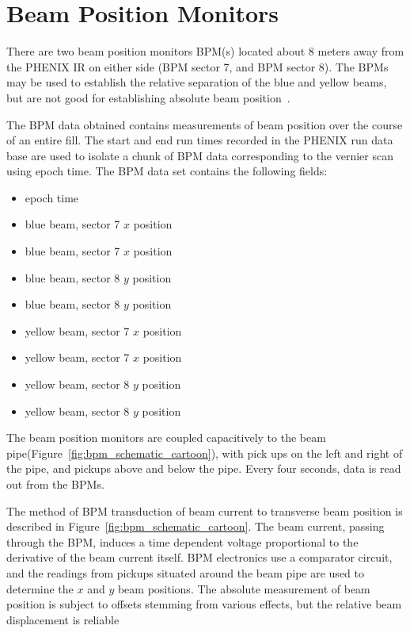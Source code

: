 \section{Beam Position Monitors}
There are two beam position monitors BPM(s) located about 8 meters away from the
PHENIX IR on either side (BPM sector 7, and BPM sector 8). The BPMs may be used
to establish the relative separation of the blue and yellow beams, but are not
good for establishing absolute beam position~\cite{Drees2013}.  

The BPM data obtained contains measurements of beam position over the course of
an entire fill. The start and end run times recorded in the PHENIX run data
base are used to isolate a chunk of BPM data corresponding to the vernier scan
using epoch time. The BPM data set contains the following fields:
\begin{itemize}
\item epoch time
\item blue beam, sector 7 $x$ position
\item blue beam, sector 7 $x$ position
\item blue beam, sector 8 $y$ position
\item blue beam, sector 8 $y$ position
\item yellow beam, sector 7 $x$ position
\item yellow beam, sector 7 $x$ position
\item yellow beam, sector 8 $y$ position
\item yellow beam, sector 8 $y$ position
\end{itemize}

The beam position monitors are coupled capacitively to the beam
pipe(Figure~\ref{fig:bpm_schematic_cartoon}), with pick ups on the left and
right of the pipe, and pickups above and below the pipe. Every four seconds,
data is read out from the BPMs. 

The method of BPM transduction of beam current to transverse beam position is
described in Figure~\ref{fig:bpm_schematic_cartoon}. The beam current, passing
through the BPM,  induces a time dependent voltage proportional to the
derivative of the beam current itself. BPM electronics use a comparator circuit,
and the readings from pickups situated around the beam pipe are used to
determine the $x$ and $y$ beam positions. The absolute measurement of beam
position is subject to offsets stemming from various effects, but the relative
beam displacement is reliable~\cite{KawallFocus2004}


